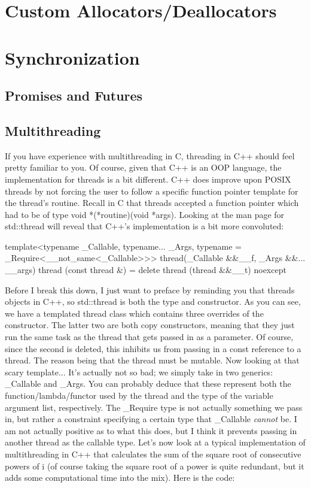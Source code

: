 \documentclass{article}
\begin{document}
\section{Custom Allocators/Deallocators}

\section{Synchronization}

\subsection{Promises and Futures}

\subsection{Multithreading}

If you have experience with multithreading in C, threading in C++ should feel pretty familiar to you. Of
course, given that C++ is an OOP language, the implementation for threads is a bit different. C++ does
improve upon POSIX threads by not forcing the user to follow a specific function pointer template for the
thread's routine. Recall in C that threads accepted a function pointer which had to be of type
void *(*routine)(void *args). Looking at the man page for std::thread will reveal that C++'s implementation
is a bit more convoluted:

\begin{cpplst}
template<typename _Callable, typename... _Args, typename = _Require<__not_same<_Callable>>>
thread(_Callable &&__f, _Args &&... __args)
thread (const thread &) = delete
thread (thread &&__t) noexcept
\end{cpplst}

Before I break this down, I just want to preface by reminding you that threads objects in C++, so
std::thread is both the type and constructor. As you can see, we have a templated thread class which contains
three overrides of the constructor. The latter two are both copy constructors, meaning that they just run the
same task as the thread that gets passed in as a parameter. Of course, since the second is deleted, this
inhibits us from passing in a const reference to a thread. The reason being that the thread must be mutable.
Now looking at that scary template... It’s actually not so bad; we simply take in two generics: \_Callable
and \_Args. You can probably deduce that these represent both the function/lambda/functor used by the thread
and the type of the variable argument list, respectively. The \_Require type is not actually something we pass
in, but rather a constraint specifying a certain type that \_Callable \textit{cannot} be. I am not actually
positive as to what this does, but I think it prevents passing in another thread as the callable type. Let's
now look at a typical implementation of multithreading in C++ that calculates the sum of the square root of
consecutive powers of i (of course taking the square root of a power is quite redundant, but it adds some
computational time into the mix). Here is the code:
\end{document}

